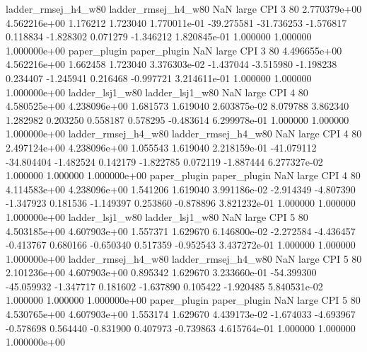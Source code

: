 ladder_rmsej_h4_w80 ladder_rmsej_h4_w80                   NaN      large      CPI                 3 80 2.770379e+00   4.562216e+00      1.176212       1.723040  1.770011e-01    -39.275581    -31.736253    -1.576817       0.118834 -1.828302   0.071279    -1.346212   1.820845e-01            1.000000        1.000000        1.000000e+00
       paper_plugin        paper_plugin                   NaN      large      CPI                 3 80 4.496655e+00   4.562216e+00      1.662458       1.723040  3.376303e-02     -1.437044     -3.515980    -1.198238       0.234407 -1.245941   0.216468    -0.997721   3.214611e-01            1.000000        1.000000        1.000000e+00
    ladder_lsj1_w80     ladder_lsj1_w80                   NaN      large      CPI                 4 80 4.580525e+00   4.238096e+00      1.681573       1.619040  2.603875e-02      8.079788      3.862340     1.282982       0.203250  0.558187   0.578295    -0.483614   6.299978e-01            1.000000        1.000000        1.000000e+00
ladder_rmsej_h4_w80 ladder_rmsej_h4_w80                   NaN      large      CPI                 4 80 2.497124e+00   4.238096e+00      1.055543       1.619040  2.218159e-01    -41.079112    -34.804404    -1.482524       0.142179 -1.822785   0.072119    -1.887444   6.277327e-02            1.000000        1.000000        1.000000e+00
       paper_plugin        paper_plugin                   NaN      large      CPI                 4 80 4.114583e+00   4.238096e+00      1.541206       1.619040  3.991186e-02     -2.914349     -4.807390    -1.347923       0.181536 -1.149397   0.253860    -0.878896   3.821232e-01            1.000000        1.000000        1.000000e+00
    ladder_lsj1_w80     ladder_lsj1_w80                   NaN      large      CPI                 5 80 4.503185e+00   4.607903e+00      1.557371       1.629670  6.146800e-02     -2.272584     -4.436457    -0.413767       0.680166 -0.650340   0.517359    -0.952543   3.437272e-01            1.000000        1.000000        1.000000e+00
ladder_rmsej_h4_w80 ladder_rmsej_h4_w80                   NaN      large      CPI                 5 80 2.101236e+00   4.607903e+00      0.895342       1.629670  3.233660e-01    -54.399300    -45.059932    -1.347717       0.181602 -1.637890   0.105422    -1.920485   5.840531e-02            1.000000        1.000000        1.000000e+00
       paper_plugin        paper_plugin                   NaN      large      CPI                 5 80 4.530765e+00   4.607903e+00      1.553174       1.629670  4.439173e-02     -1.674033     -4.693967    -0.578698       0.564440 -0.831900   0.407973    -0.739863   4.615764e-01            1.000000        1.000000        1.000000e+00
